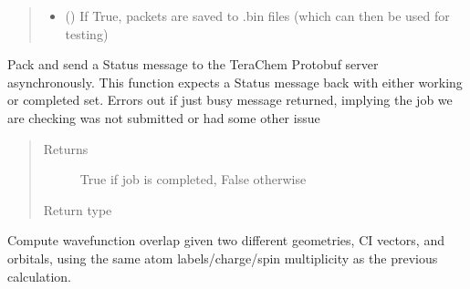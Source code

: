 \documentclass[letterpaper,10pt,english]{sphinxmanual}
\begin{document}
\begin{fulllineitems}
\begin{fulllineitems}
\begin{quote}
\begin{description}
\begin{itemize}
\item {} 
 () \textendash{} If True, packets are saved to .bin files (which can then be used for testing)

\end{itemize}

\end{description}\end{quote}

\end{fulllineitems}


\begin{fulllineitems}
\label{\detokenize{tcpb:tcpb.tcpb.TCProtobufClient.check_job_complete}}
Pack and send a Status message to the TeraChem Protobuf server asynchronously.
This function expects a Status message back with either working or completed set.
Errors out if just busy message returned, implying the job we are checking was not submitted
or had some other issue
\begin{quote}\begin{description}
\item[{Returns}] \leavevmode
True if job is completed, False otherwise

\item[{Return type}] \leavevmode
{}

\end{description}\end{quote}

\end{fulllineitems}


\begin{fulllineitems}
\label{\detokenize{tcpb:tcpb.tcpb.TCProtobufClient.compute_ci_overlap}}
Compute wavefunction overlap given two different geometries, CI vectors, and orbitals,
using the same atom labels/charge/spin multiplicity as the previous calculation.


\end{fulllineitems}
\end{fulllineitems}
\end{document}
